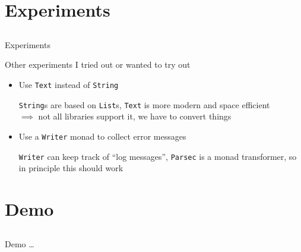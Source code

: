 \section{Experiments}
\subsection*{}

\begin{frame}{Experiments}
  
  Other experiments I tried out or wanted to try out

  \begin{itemize}
    \item Use \verb|Text| instead of \verb|String|

    \verb|String|s are based on \verb|List|s,
    \verb|Text| is more modern and space efficient\\
    $\implies$ not all libraries support it, we have to convert things

    \pause
    \item Use a \verb|Writer| monad to collect error messages

    \verb|Writer| can keep track of ``log messages'',
    \verb|Parsec| is a monad transformer, so in principle this should work
  \end{itemize}

\end{frame}

\section{Demo}
\subsection*{}

\begin{frame}{Demo}
  \ldots
\end{frame}



